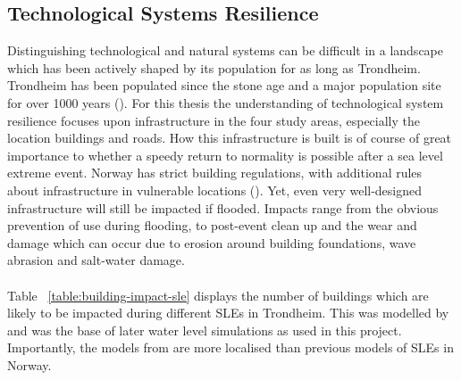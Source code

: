 \subsection{Technological Systems Resilience}
Distinguishing technological and natural systems can be difficult in a landscape which has been actively shaped by its population for as long as Trondheim. Trondheim has been populated since the stone age and a major population site for over 1000 years (\cite{sjavik_z_2010}). For this thesis the understanding of technological system resilience focuses upon infrastructure in the four study areas, especially the location buildings and roads. How this infrastructure is built is of course of great importance to whether a speedy return to normality is possible after a sea level extreme event. Norway has strict building regulations, with additional rules about infrastructure in vulnerable locations (\cite{direktoratet_for_byggkvalitet_direktoratet_nodate}). Yet, even very well-designed infrastructure will still be impacted if flooded. Impacts range from the obvious prevention of use during flooding, to post-event clean up and the wear and damage which can occur due to  erosion around building foundations, wave abrasion and salt-water damage.
\paragraph{}
Table ~\ref{table:building-impact-sle} displays the number of buildings which are likely to be impacted during different SLEs in Trondheim. This was modelled by \cite{kartverket_se_2021} and was the base of later water level simulations as used in this project. Importantly, the models from \cite{kartverket_se_2021} are more localised than previous models of SLEs in Norway.

